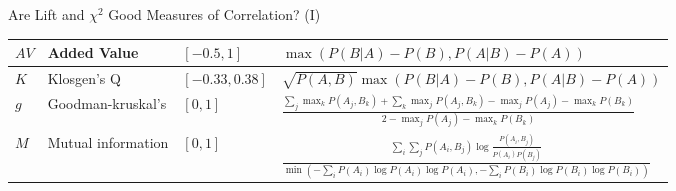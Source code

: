 \begin{frame}{Are Lift and $\chi^2$ Good Measures of Correlation? (I)}
{\begin{tabular}{|m{}<{\centering}|m{}<{\centering}|m{}<{\centering}|m{}<{\centering}|}
			\hline
			$AV$            & Added Value        & $[-0.5,1]$     & $\max(P(B|A)-P(B),P(A|B)-P(A))$                                                                                                                           \\
			\hline
			$K$             & Klosgen's Q        & $[-0.33,0.38]$ & $\sqrt{P(A,B)}\max(P(B|A)-P(B),P(A|B)-P(A))$                                                                                                              \\
			\hline
			$g$             & Goodman-kruskal's  & $[0,1]$        & $\frac{\sum_j \max_k P(A_j,B_k) + \sum_k \max_j P(A_j,B_k)-\max_j P(A_j) -
			\max_k P(B_k)}{2 - \max_j P(A_j) - \max_k P(B_k)}$                                                                                                                                                                \\
			\hline
			$M$             & Mutual information & $[0,1]$        & $\frac{\sum_i \sum_j P(A_i,B_j) \log \frac{P(A_i,B_j)}{P(A_i)P(B_j)}}{\min(-\sum_i P(A_i) \log P(A_i)\log P(A_i),-\sum_i P(B_i)\log P(B_i) \log P(B_i))}$ \\
			\hline
		\end{tabular}
	}
\end{frame}

